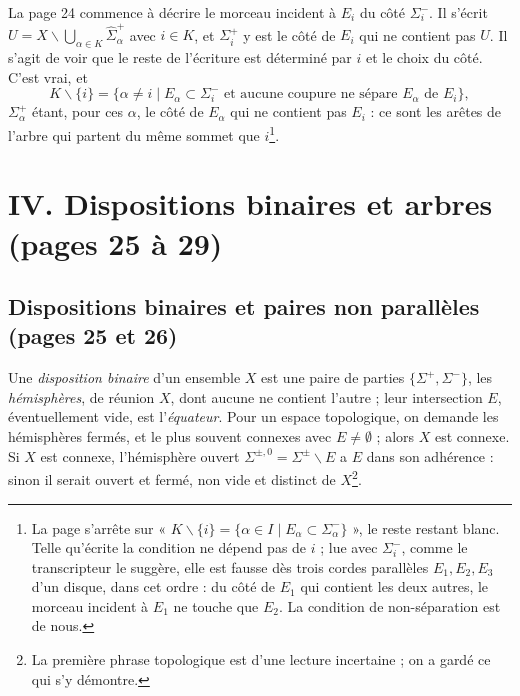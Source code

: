 \documentclass[11pt,a4paper]{article}
\begin{document}
La page 24 commence à décrire le morceau incident à $E_i$ du côté
$\Sigma_i^{-}$. Il s'écrit $U = X \smallsetminus \bigcup_{\alpha \in K}
\widehat{\Sigma}_\alpha^{+}$ avec $i \in K$, et $\Sigma_i^{+}$ y est le côté
de $E_i$ qui ne contient pas $U$. Il s'agit de voir que le reste de
l'écriture est déterminé par $i$ et le choix du côté. C'est vrai, et
\[
K \smallsetminus \{i\} = \{ \alpha \neq i \mid E_\alpha \subset
\Sigma_i^{-} \text{ et aucune coupure ne sépare } E_\alpha \text{ de } E_i
\},
\]
$\Sigma_\alpha^{+}$ étant, pour ces $\alpha$, le côté de $E_\alpha$ qui ne
contient pas $E_i$ : ce sont les arêtes de l'arbre qui partent du même
sommet que $i$\footnote{La page s'arrête sur « $K \smallsetminus \{i\} = \{
\alpha \in I \mid E_\alpha \subset \Sigma_\alpha^{-} \}$ », le reste restant
blanc. Telle qu'écrite la condition ne dépend pas de $i$ ; lue avec
$\Sigma_i^{-}$, comme le transcripteur le suggère, elle est fausse dès trois
cordes parallèles $E_1, E_2, E_3$ d'un disque, dans cet ordre : du côté de
$E_1$ qui contient les deux autres, le morceau incident à $E_1$ ne touche que
$E_2$. La condition de non-séparation est de nous.}.

\section*{IV. Dispositions binaires et arbres (pages 25 à 29)}

\subsection*{Dispositions binaires et paires non parallèles (pages 25 et 26)}

Une \emph{disposition binaire} d'un ensemble $X$ est une paire de parties
$\{\Sigma^{+}, \Sigma^{-}\}$, les \emph{hémisphères}, de réunion $X$, dont
aucune ne contient l'autre ; leur intersection $E$, éventuellement vide, est
l'\emph{équateur}. Pour un espace topologique, on demande les hémisphères
fermés, et le plus souvent connexes avec $E \neq \emptyset$ ; alors $X$ est
connexe. Si $X$ est connexe, l'hémisphère ouvert $\Sigma^{\pm,0} = \Sigma^{\pm}
\smallsetminus E$ a $E$ dans son adhérence : sinon il serait ouvert et
fermé, non vide et distinct de $X$\footnote{La première phrase topologique
est d'une lecture incertaine ; on a gardé ce qui s'y démontre.}.
\end{document}

